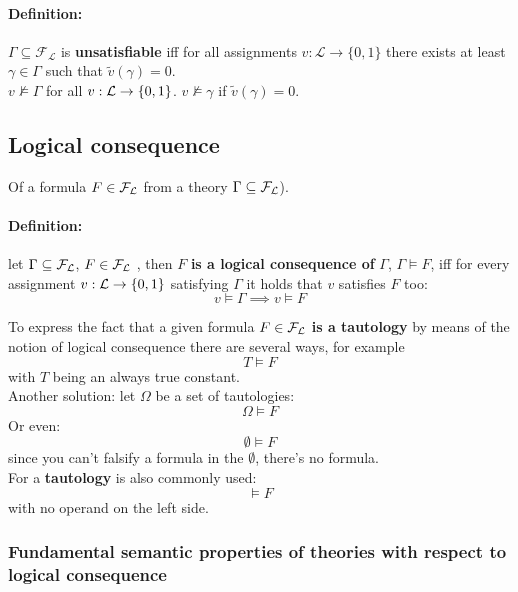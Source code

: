 \documentclass[11pt]{article}
\begin{document}
	\paragraph{Definition:} $\Gamma \subseteq \mathcal{F}_\mathcal{L}$ is \textbf{unsatisfiable} iff for all assignments $v: \mathcal{L} \rightarrow \{0,1\}$ there exists at least $\gamma \in \Gamma$ such that $\tilde{v} (\gamma) = 0$.\\
	
	$v \not \models \Gamma$ for all $v: \mathcal{L} \rightarrow \{0,1\}$. $v \not \models \gamma$ if $\tilde{v} (\gamma) = 0$.\\
	
	\newpage
	
	\subsection{Logical consequence}
	Of a formula $F \in \mathcal{F}_\mathcal{L}$ from a theory $\Gamma \subseteq \mathcal{F}_\mathcal{L}$).\\
	
	\paragraph{Definition:} let $\Gamma \subseteq \mathcal{F}_\mathcal{L}$, $F \in \mathcal{F}_\mathcal{L}$ , then $F$ \textbf{is a logical consequence of} $\Gamma$, $\Gamma \models F$, iff for every assignment $v: \mathcal{L} \rightarrow \{0,1\}$ satisfying $\Gamma$ it holds that $v$ satisfies $F$ too:
	$$ v \models \Gamma \implies v \models F $$
	
	\vfill
	
	To express the fact that a given formula $F \in \mathcal{F}_\mathcal{L}$ \textbf{is a tautology} by means of the notion of logical consequence there are several ways, for example 
	$$ T \models F $$
	with $T$ being an always true constant.\\
	Another solution: let $\Omega$ be a set of tautologies: 
	$$\Omega \models F$$
	Or even:
	$$ \emptyset \models F$$
	since you can't falsify a formula in the $\emptyset$, there's no formula.\\
	For a \textbf{tautology} is also commonly used:
	$$ \models F$$
	with no operand on the left side.\\
	
	\newpage
	
	\subsubsection{Fundamental semantic properties of theories with respect to logical consequence}
	
\end{document}

